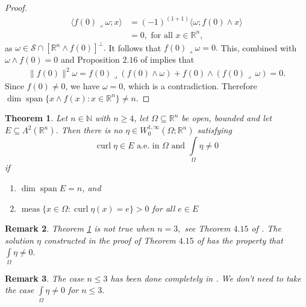 \documentclass[11pt, a4paper, reqno]{amsart}
\numberwithin{equation}{section}
\newcommand{\spann}{\operatorname{span}}
\newcommand{\meas}{\operatorname{meas}}
\newcommand{\curl}{\operatorname{curl}}
\newtheorem{theorem}{Theorem}[section]
\newtheorem{remark}[theorem]{Remark}
\begin{document}
\begin{proof}
\begin{align*}
\langle f(0)\lrcorner \omega; x\rangle &=(-1)^{(1+1)}\langle \omega; f(0)\wedge x\rangle\\
&=0, \textrm{ for all }x\in \mathbb R^n,
\end{align*}
as $\omega \in \mathcal {S}\cap \left[\mathbb R^n \wedge f(0)\right]^{\perp}.$ It follows that $f(0)\lrcorner  \omega =0.$
This, combined with $\omega \wedge f(0)=0$ and Proposition $2.16$ of \cite{csato2011pullback} implies that 
\begin{align*}
    \|f(0)\|^2  \omega = f(0)\lrcorner \left( f(0)\wedge \omega\right) +f(0)\wedge \left(f(0)\lrcorner \ \omega\right)=0.
\end{align*}
Since $f(0)\neq 0$, we have $\omega=0$, which is a contradiction. 
Therefore $\dim \spann \{x\wedge f(x):x\in \mathbb R^n\}\neq n.$ 
\end{proof}
\begin{theorem}\label{theorem1'}
Let $n\in \mathbb N$ with $n\geq 4$, let $\Omega \subseteq \mathbb R^n$ be open, bounded and let $E\subseteq \Lambda^2(\mathbb R^n)$. Then there is no $\eta\in W_0^{1,\infty}(\Omega;\mathbb R^n)$ satisfying 
\begin{equation}\label{ eq 2'}
    \curl \eta \in E \textrm{ a.e.  in }\Omega \textrm{ and } \displaystyle \int\limits_{\Omega }\eta\neq 0
\end{equation}
 if  
 \begin{enumerate}
     \item [(i)] $\dim \spann E=n$, and 
     \item [(ii)] $\meas \{x\in \Omega: \curl \eta(x)=e\}>0$ for all $e\in E$
 \end{enumerate}
\end{theorem}
\begin{remark}
    Theorem \ref{theorem1'} is not true when $n=3,$ see Theorem $4.15$ of \cite{bandyopadhyay2007differential}. The solution $\eta$ constructed in the proof of Theorem $4.15$ of \cite{bandyopadhyay2007differential} has the property that $\displaystyle\int\limits_{\Omega}\eta \neq 0.$
\end{remark}
\begin{remark}
The case $n\leq 3$ has been done completely in \cite{bandyopadhyay2007differential}. We don't need to take the case $\int\limits_{\Omega}\eta\neq 0$ for $n\leq 3.$
\end{remark}
\end{document}
